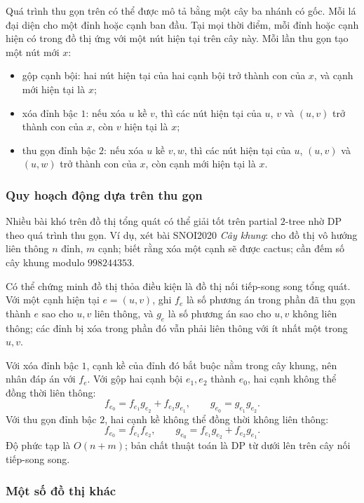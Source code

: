 \documentclass[11pt]{article}
\begin{document}
Quá trình thu gọn trên có thể được mô tả bằng một cây ba nhánh có gốc. Mỗi lá
đại diện cho một đỉnh hoặc cạnh ban đầu. Tại mọi thời điểm, mỗi đỉnh hoặc cạnh
hiện có trong đồ thị ứng với một nút hiện tại trên cây này. Mỗi lần thu gọn
tạo một nút mới $x$:
\begin{itemize}
  \item gộp cạnh bội: hai nút hiện tại của hai cạnh bội trở thành con của $x$,
  và cạnh mới hiện tại là $x$;
  \item xóa đỉnh bậc $1$: nếu xóa $u$ kề $v$, thì các nút hiện tại của $u$,
  $v$ và $(u,v)$ trở thành con của $x$, còn $v$ hiện tại là $x$;
  \item thu gọn đỉnh bậc $2$: nếu xóa $u$ kề $v,w$, thì các nút hiện tại của
  $u$, $(u,v)$ và $(u,w)$ trở thành con của $x$, còn cạnh mới hiện tại là $x$.
\end{itemize}

\subsubsection{Quy hoạch động dựa trên thu gọn}

Nhiều bài khó trên đồ thị tổng quát có thể giải tốt trên partial $2$-tree nhờ
DP theo quá trình thu gọn. Ví dụ, xét bài SNOI2020 \emph{Cây khung}: cho đồ thị
vô hướng liên thông $n$ đỉnh, $m$ cạnh; biết rằng xóa một cạnh sẽ được cactus;
cần đếm số cây khung modulo $998244353$.

Có thể chứng minh đồ thị thỏa điều kiện là đồ thị nối tiếp-song song tổng quát.
Với một cạnh hiện tại $e=(u,v)$, ghi $f_e$ là số phương án trong phần đã thu
gọn thành $e$ sao cho $u,v$ liên thông, và $g_e$ là số phương án sao cho
$u,v$ không liên thông; các đỉnh bị xóa trong phần đó vẫn phải liên thông với
ít nhất một trong $u,v$.

Với xóa đỉnh bậc $1$, cạnh kề của đỉnh đó bắt buộc nằm trong cây khung, nên
nhân đáp án với $f_e$. Với gộp hai cạnh bội $e_1,e_2$ thành $e_0$, hai cạnh
không thể đồng thời liên thông:
\[
  f_{e_0}=f_{e_1}g_{e_2}+f_{e_2}g_{e_1},\qquad
  g_{e_0}=g_{e_1}g_{e_2}.
\]
Với thu gọn đỉnh bậc $2$, hai cạnh kề không thể đồng thời không liên thông:
\[
  f_{e_0}=f_{e_1}f_{e_2},\qquad
  g_{e_0}=f_{e_1}g_{e_2}+f_{e_2}g_{e_1}.
\]
Độ phức tạp là $O(n+m)$; bản chất thuật toán là DP từ dưới lên trên cây
nối tiếp-song song.

\subsubsection{Một số đồ thị khác}
\end{document}
